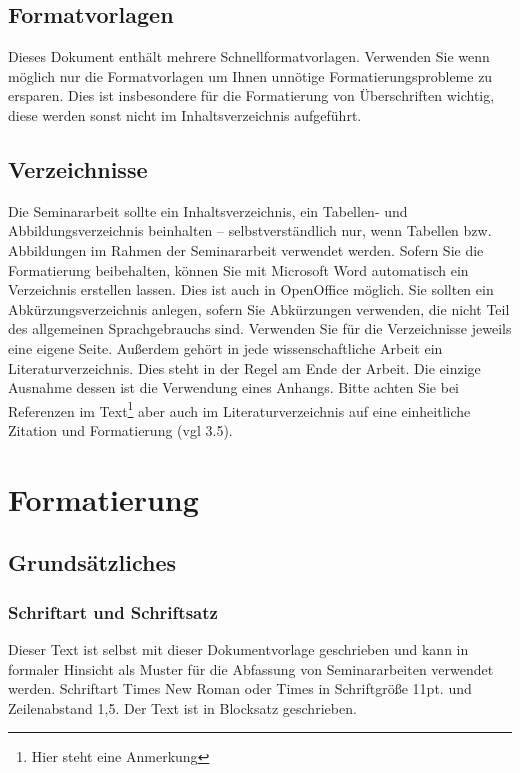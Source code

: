 \documentclass[a4paper,11pt]{article}
\begin{document}
\subsection{Formatvorlagen}
Dieses Dokument enthält mehrere Schnellformatvorlagen. Verwenden Sie wenn möglich nur die Formatvorlagen um Ihnen unnötige Formatierungsprobleme zu ersparen. Dies ist insbesondere für die Formatierung von Überschriften wichtig, diese werden sonst nicht im Inhaltsverzeichnis aufgeführt. 

\subsection{Verzeichnisse}
Die Seminararbeit sollte ein Inhaltsverzeichnis, ein Tabellen- und Abbildungsverzeichnis beinhalten – selbstverständlich nur, wenn Tabellen bzw. Abbildungen im Rahmen der Seminararbeit verwendet werden. Sofern Sie die Formatierung beibehalten, können Sie mit Microsoft Word automatisch ein Verzeichnis erstellen lassen. Dies ist auch in OpenOffice möglich. Sie sollten ein Abkürzungsverzeichnis anlegen, sofern Sie Abkürzungen verwenden, die nicht Teil des allgemeinen Sprachgebrauchs sind. Verwenden Sie für die Verzeichnisse jeweils eine eigene Seite.
Außerdem gehört in jede wissenschaftliche Arbeit ein Literaturverzeichnis. Dies steht in der Regel am Ende der Arbeit. Die einzige Ausnahme dessen ist die Verwendung eines Anhangs. Bitte achten Sie bei Referenzen im Text\footnote{Hier steht eine Anmerkung} aber auch im Literaturverzeichnis auf eine einheitliche Zitation und Formatierung (vgl 3.5).







\section{Formatierung}
\subsection{Grundsätzliches}
\subsubsection{Schriftart und Schriftsatz}
Dieser Text ist selbst mit dieser Dokumentvorlage geschrieben und kann in formaler Hinsicht als Muster für die Abfassung von Seminararbeiten verwendet werden. Schriftart Times New Roman oder Times in Schriftgröße 11pt. und Zeilenabstand 1,5. Der Text ist in Blocksatz geschrieben. 
\end{document}
